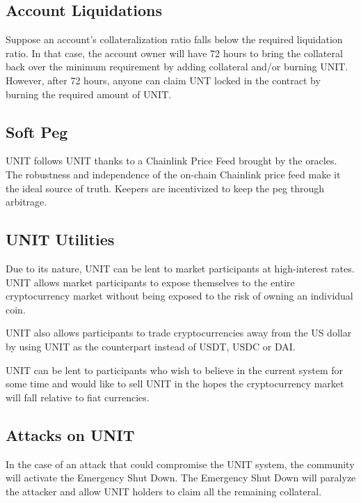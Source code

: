 \documentclass[12pt]{article}
\begin{document}
\subsection{Account Liquidations}

Suppose an account's collateralization ratio falls below the required liquidation ratio. In that case, the account owner will have 72 hours to bring the collateral back over the minimum requirement by adding collateral and/or burning UNIT. However, after 72 hours, anyone can claim UNT locked in the contract by burning the required amount of UNIT.


\subsection{Soft Peg}

UNIT follows UNIT thanks to a Chainlink Price Feed brought by the oracles. The robustness and independence of the on-chain Chainlink price feed make it the ideal source of truth. Keepers are incentivized to keep the peg through arbitrage.


\subsection{UNIT Utilities}

Due to its nature, UNIT can be lent to market participants at high-interest rates. UNIT allows market participants to expose themselves to the entire cryptocurrency market without being exposed to the risk of owning an individual coin. 

UNIT also allows participants to trade cryptocurrencies away from the US dollar by using UNIT as the counterpart instead of USDT, USDC or DAI.

UNIT can be lent to participants who wish to believe in the current system for some time and would like to sell UNIT in the hopes the cryptocurrency market will fall relative to fiat currencies.



\subsection{Attacks on UNIT}

In the case of an attack that could compromise the UNIT system, the community will activate the Emergency Shut Down. The Emergency Shut Down will paralyze the attacker and allow UNIT holders to claim all the remaining collateral.
\end{document}
